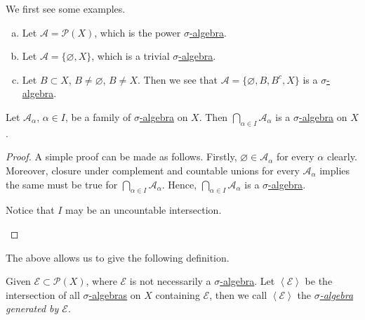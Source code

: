 \begin{eg}
	We first see some examples.
	\begin{enumerate}[(a)]
		\item Let \(\mathcal{A} = \mathcal{P} (X)\), which is the power \hyperref[def:sigma-algebra]{\(\sigma\)-algebra}.
		\item Let \(\mathcal{A} = \{\varnothing , X\}\), which is a trivial \hyperref[def:sigma-algebra]{\(\sigma\)-algebra}.
		\item Let \(B\subset X\), \(B\neq \varnothing \), \(B\neq X\). Then we see that \(\mathcal{A} = \{\varnothing , B, B^{c}, X\}\) is a \hyperref[def:sigma-algebra]{\(\sigma\)-algebra}.
	\end{enumerate}
\end{eg}

\begin{lemma}
	Let \(\mathcal{A}_{\alpha}\), \(\alpha\in I\), be a family of \hyperref[def:sigma-algebra]{\(\sigma\)-algebra} on \(X\). Then \(\bigcap_{\alpha\in I} \mathcal{A}_{\alpha}\) is a \hyperref[def:sigma-algebra]{\(\sigma\)-algebra} on \(X\).
\end{lemma}
\begin{proof}
	A simple proof can be made as follows. Firstly, \(\varnothing \in \mathcal{A}_{\alpha}\) for every \(\alpha\) clearly. Moreover, closure under complement and countable unions for every \(\mathcal{A}_{\alpha}\) implies the same must be true for \(\bigcap_{\alpha\in I} \mathcal{A}_{\alpha}\). Hence, \(\bigcap_{\alpha\in I} \mathcal{A}_{\alpha}\) is a \hyperref[def:sigma-algebra]{\(\sigma\)-algebra}.
	\begin{remark}
		Notice that \(I\) may be an uncountable intersection.
	\end{remark}
\end{proof}

The above allows us to give the following definition.
\begin{definition}\label{def:generation-of-sigma-algebra}
	Given \(\mathcal{E} \subset \mathcal{P} (X) \), where \(\mathcal{E}\) is not necessarily a \hyperref[def:sigma-algebra]{\(\sigma\)-algebra}. Let \(\left<\mathcal{E}\right>\) be the intersection of all \hyperref[def:sigma-algebra]{\(\sigma\)-algebras} on \(X\) containing \(\mathcal{E}\), then we call \(\left<\mathcal{E} \right>\) the \emph{\hyperref[def:sigma-algebra]{\(\sigma\)-algebra} generated by \(\mathcal{E}\)}.
\end{definition}

